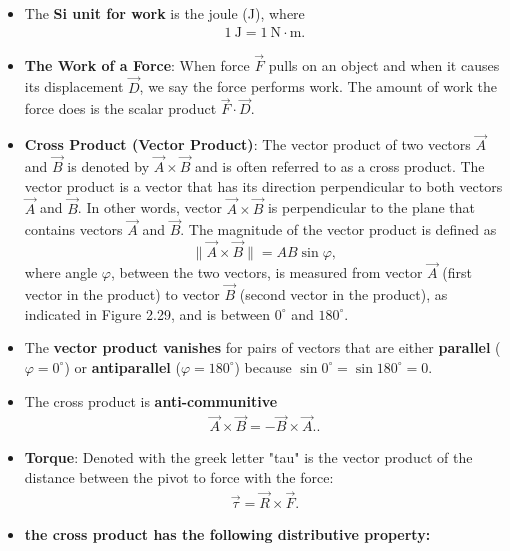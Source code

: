 \documentclass{report}
\begin{document}
\begin{itemize}
    \item The \textbf{Si unit for work} is the joule (J), where 
        \begin{align*}
            1\ \text{J} = 1\ \text{N} \cdot \text{m} 
        .\end{align*}
    \item \textbf{The Work of a Force}: When force $\vec{F}$ pulls on an object and when it causes its displacement $\vec{D}$, we say the force performs work. The amount of work the force does is the scalar product $\vec{F} \cdot \vec{D}$.
    \item \textbf{Cross Product (Vector Product)}: 
        The vector product of two vectors $\vec{A}$ and $\vec{B}$ is denoted by $\vec{A} \times \vec{B}$ and is often referred to as a cross product. The vector product is a vector that has its direction perpendicular to both vectors $\vec{A}$ and $\vec{B}$. In other words, vector $\vec{A} \times \vec{B}$ is perpendicular to the plane that contains vectors $\vec{A}$ and $\vec{B}$. The magnitude of the vector product is defined as
        \begin{equation}
            \lVert \vec{A} \times \vec{B} \rVert = AB \sin \varphi,
        \end{equation}
        where angle $\varphi$, between the two vectors, is measured from vector $\vec{A}$ (first vector in the product) to vector $\vec{B}$ (second vector in the product), as indicated in Figure 2.29, and is between $0^\circ$ and $180^\circ$.
    \item     The \textbf{vector product vanishes} for pairs of vectors that are either \textbf{parallel} ($\varphi=0^\circ$) or \textbf{antiparallel} ($\varphi=180^\circ$) because $\sin 0^\circ = \sin 180^\circ = 0$.
    \item The cross product is \textbf{anti-communitive}
        \begin{align*}
            \vec{A} \times \vec{B} = -\vec{B} \times \vec{A}.
        .\end{align*}
    \item \textbf{Torque}: Denoted with the greek letter "tau" is the vector product of the distance between the pivot to force with the force:
        \begin{align*}
            \vec{\tau} = \vec{R} \times \vec{F}
        .\end{align*}
    \item \textbf{the cross product has the following distributive property:}
        \begin{align*}

\end{align*}
\end{itemize}
\end{document}
